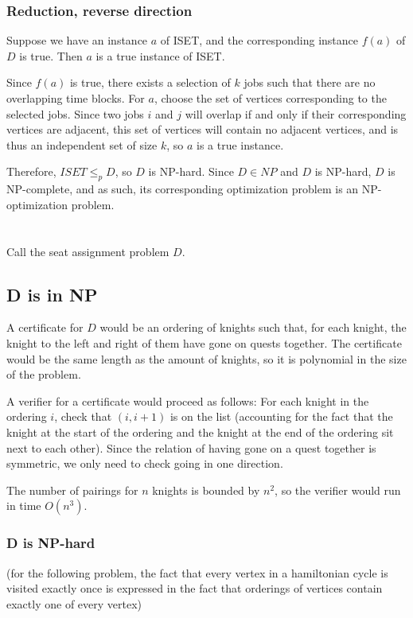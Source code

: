 \documentclass[11pt]{article}
\begin{document}
\subsubsection*{Reduction, reverse direction}

Suppose we have an instance $a$ of ISET, and the corresponding instance $f(a)$ of $D$ is true. Then $a$ is a true instance of ISET.

Since $f(a)$ is true, there exists a selection of $k$ jobs such that there are no overlapping time blocks. For $a$, choose the set of vertices corresponding to the selected jobs. Since two jobs $i$ and $j$ will overlap if and only if their corresponding vertices are adjacent, this set of vertices will contain no adjacent vertices, and is thus an independent set of size $k$, so $a$ is a true instance.


Therefore, $ISET \leq_p D$, so $D$ is NP-hard. Since $D \in NP$ and $D$ is NP-hard, $D$ is NP-complete, and as such, its corresponding optimization problem is an NP-optimization problem.

\pagebreak
\section{}

Call the seat assignment problem $D$.


\subsection*{D is in NP}

A certificate for $D$ would be an ordering of knights such that, for each knight, the knight to the left and right of them have gone on quests together. The certificate would be the same length as the amount of knights, so it is polynomial in the size of the problem.

A verifier for a certificate would proceed as follows: For each knight in the ordering $i$, check that $(i, i+1)$ is on the list (accounting for the fact that the knight at the start of the ordering and the knight at the end of the ordering sit next to each other). Since the relation of having gone on a quest together is symmetric, we only need to check going in one direction. 

The number of pairings for $n$ knights is bounded by $n^2$, so the verifier would run in time $O(n^3)$.

\subsubsection*{D is NP-hard}
(for the following problem, the fact that every vertex in a hamiltonian cycle is visited exactly once is expressed in the fact that orderings of vertices contain exactly one of every vertex)
\end{document}
